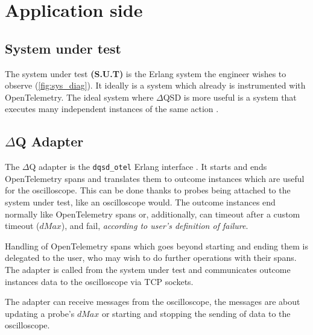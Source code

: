 \section{Application side} 
    \subsection{System under test} The system under test \textbf{(S.U.T)} is the Erlang system the engineer wishes to observe (\cref{fig:sys_diag}). It ideally is a system which already is instrumented with OpenTelemetry. The ideal system where $\Delta$QSD is more useful is a system that executes many independent instances of the same action \cite{dq-tut}. 
    
    \subsection{$\Delta$Q Adapter} 
    The $\Delta$Q adapter is the \texttt{dqsd\_otel} Erlang interface \cite{wrapper}. It starts and ends OpenTelemetry spans and translates them to outcome instances which are useful for the oscilloscope. This can be done thanks to probes being attached to the system under test, like an oscilloscope would. The outcome instances end normally like OpenTelemetry spans or, additionally, can timeout after a custom timeout ($dMax$), and fail, \textit{according to user's definition of failure}. 
    
    Handling of OpenTelemetry spans which goes beyond starting and ending them is delegated to the user, who may wish to do further operations with their spans. 
    The adapter is called from the system under test and communicates outcome instances data to the oscilloscope via TCP sockets. 
    
    The adapter can receive messages from the oscilloscope, the messages are about updating a probe's $dMax$ or starting and stopping the sending of data to the oscilloscope.
